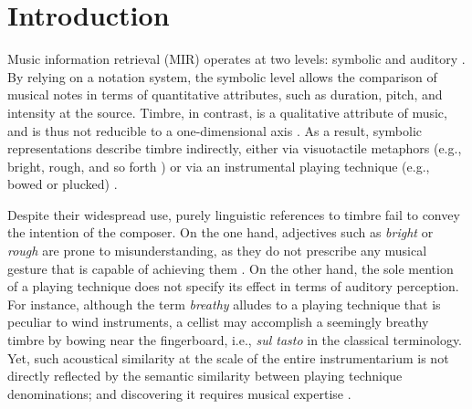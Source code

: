 \documentclass{bmcart}
\makeatletter
\newcommand*{\eg}{e.g.,\@\xspace}
\makeatother
\begin{document}




\section*{Introduction}
\label{sec:intro}

Music information retrieval (MIR) operates at two levels: symbolic and auditory \cite{downie2003mir}.
By relying on a notation system, the symbolic level allows the comparison of musical notes in terms of quantitative attributes, such as duration, pitch, and intensity at the source.
Timbre, in contrast, is a qualitative attribute of music, and is thus not reducible to a one-dimensional axis \cite{siedenburg2019chapter}.
As a result, symbolic representations describe timbre indirectly, either via visuotactile metaphors (\eg{} bright, rough, and so forth \cite{faure1996icmpc}) or via an instrumental playing technique (\eg{} bowed or plucked) \cite{lostanlen2018extended}.

Despite their widespread use, purely linguistic references to timbre fail to convey the intention of the composer.
On the one hand, adjectives such as \emph{bright} or \emph{rough} are prone to misunderstanding, as they do not prescribe any musical gesture that is capable of achieving them \cite{antoine2018isma}.
On the other hand, the sole mention of a playing technique does not specify its effect in terms of auditory perception.
For instance, although the term \emph{breathy} alludes to a playing technique that is peculiar to wind instruments, a cellist may accomplish a seemingly breathy timbre by bowing near the fingerboard, i.e., \emph{sul tasto} in the classical terminology.
Yet, such acoustical similarity at the scale of the entire instrumentarium is not directly reflected by the semantic similarity between playing technique denominations; and discovering it requires musical expertise \cite{kolozali2011ismir}.
\end{document}

